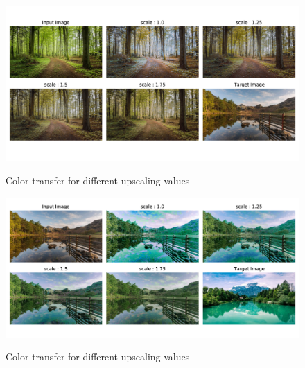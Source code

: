 \documentclass[11pt]{beamer}
\begin{document}
\begin{frame}
\begin{figure}
\includegraphics[width = \textwidth]{landscape42_6.pdf} \label{42_fig}
\caption{Color transfer for different upscaling values}
\end{figure}
\end{frame}


\begin{frame}
\begin{figure}
\includegraphics[width = \textwidth]{landscape21_6.pdf} \label{21_fig}
\caption{Color transfer for different upscaling values}
\end{figure}
\end{frame}
\end{document}
